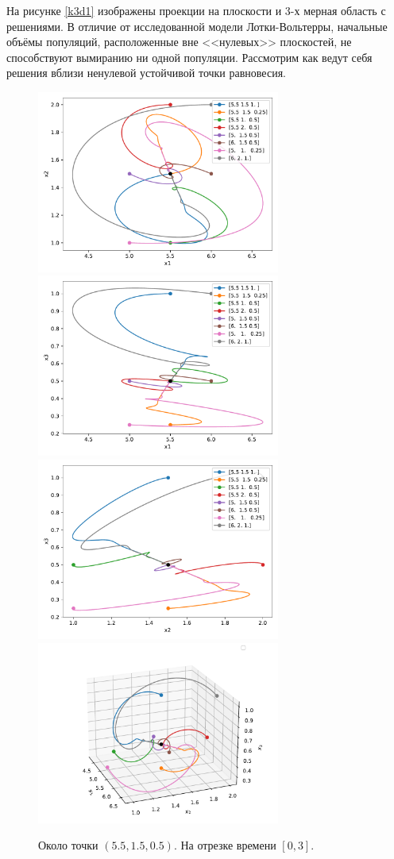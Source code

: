     На рисунке \ref{k3d1} изображены проекции на плоскости и 3-х мерная область с решениями. В отличие от исследованной модели Лотки-Вольтерры, начальные объёмы популяций, расположенные вне <<нулевых>> плоскостей, не способствуют вымиранию ни одной популяции. Рассмотрим как ведут себя решения вблизи ненулевой устойчивой точки равновесия.
    
    \begin{figure}[H]
        \centering
        \includegraphics[width=8cm]{pictures/kx_12phase_g.pdf}
        \includegraphics[width=8cm]{pictures/kx_13phase_g.pdf}
        \includegraphics[width=8cm]{pictures/kx_23phase_g.pdf}
        \includegraphics[width=8cm]{pictures/kx_phase3_g.pdf}
        \caption{Около точки \( (5.5, 1.5, 0.5) \). На отрезке времени \( [0, 3] \).} \label{k3d2}
    \end{figure}

